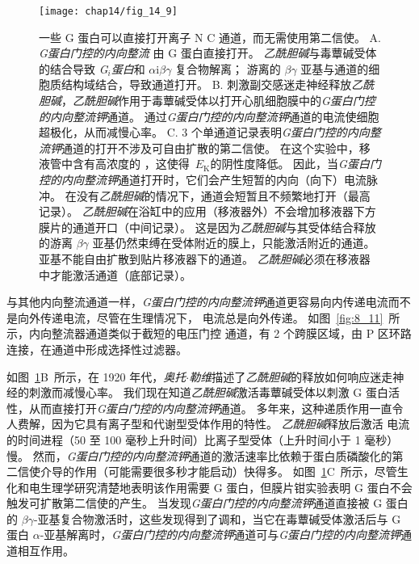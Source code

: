 \begin{figure}[htbp]
	\centering
	\texttt{[image: chap14/fig\_14\_9]}
	\caption{一些 G 蛋白可以直接打开离子 N C 通道，而无需使用第二信使。
		A. \textit{G蛋白门控的内向整流}  由 G 蛋白直接打开。
		\textit{乙酰胆碱}与毒蕈碱受体的结合导致 \textit{G$_i $蛋白}和 $\alpha$i$\beta \gamma$ 复合物解离；
		游离的 $\beta \gamma$ 亚基与通道的细胞质结构域结合，导致通道打开。
		B. 刺激副交感迷走神经释放\textit{乙酰胆碱}，\textit{乙酰胆碱}作用于毒蕈碱受体以打开心肌细胞膜中的\textit{G蛋白门控的内向整流钾}通道。
		通过\textit{G蛋白门控的内向整流钾}通道的电流使细胞超极化，从而减慢心率\cite{toda1967interactions}。
		C. 3 个单通道记录表明\textit{G蛋白门控的内向整流钾}通道的打开不涉及可自由扩散的第二信使。
		在这个实验中，移液管中含有高浓度的 ，这使得~$E_\text{K}$的阴性度降低。
		因此，当\textit{G蛋白门控的内向整流钾}通道打开时，它们会产生短暂的内向（向下）电流脉冲。
		在没有\textit{乙酰胆碱}的情况下，通道会短暂且不频繁地打开（最高记录）。
		\textit{乙酰胆碱}在浴缸中的应用（移液器外）不会增加移液器下方膜片的通道开口（中间记录）。
		这是因为\textit{乙酰胆碱}与其受体结合释放的游离 $\beta \gamma$ 亚基仍然束缚在受体附近的膜上，只能激活附近的通道。
		亚基不能自由扩散到贴片移液器下的通道。
		\textit{乙酰胆碱}必须在移液器中才能激活通道（底部记录）\cite{soejima1984mode}。}
	\label{fig:14_9}
\end{figure}


与其他内向整流通道一样，\textit{G蛋白门控的内向整流钾}通道更容易向内传递电流而不是向外传递电流，尽管在生理情况下， 电流总是向外传递。
如图~\ref{fig:8_11}~所示，内向整流器通道类似于截短的电压门控  通道，有 2 个跨膜区域，由 P 区环路连接，在通道中形成选择性过滤器。


如图~\ref{fig:14_9}B~所示，在 1920 年代，\textit{奥托$\cdot$勒维}描述了\textit{乙酰胆碱}的释放如何响应迷走神经的刺激而减慢心率。
我们现在知道\textit{乙酰胆碱}激活毒蕈碱受体以刺激 G 蛋白活性，从而直接打开\textit{G蛋白门控的内向整流钾}通道。
多年来，这种递质作用一直令人费解，因为它具有离子型和代谢型受体作用的特性。
\textit{乙酰胆碱}释放后激活  电流的时间进程（50 至 100 毫秒上升时间）比离子型受体（上升时间小于 1 毫秒）慢。
然而，\textit{G蛋白门控的内向整流钾}通道的激活速率比依赖于蛋白质磷酸化的第二信使介导的作用（可能需要很多秒才能启动）快得多。
如图~\ref{fig:14_9}C~所示，尽管生化和电生理学研究清楚地表明该作用需要 G 蛋白，但膜片钳实验表明 G 蛋白不会触发可扩散第二信使的产生。
当发现\textit{G蛋白门控的内向整流钾}通道直接被 G 蛋白的 $\beta \gamma$-亚基复合物激活时，这些发现得到了调和，当它在毒蕈碱受体激活后与 G 蛋白 $\alpha$-亚基解离时，\textit{G蛋白门控的内向整流钾}通道可与\textit{G蛋白门控的内向整流钾}通道相互作用。


